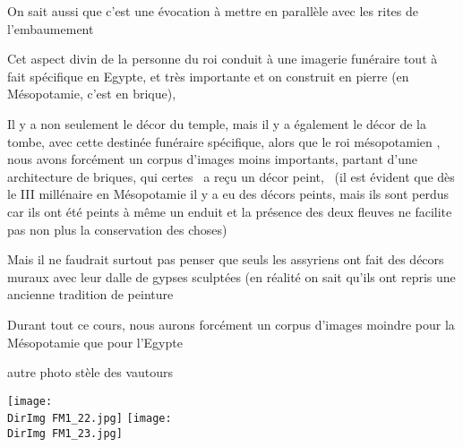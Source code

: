 \documentclass[a4paper]{article}
\newcommand{\DirImg}{../img/FaivreMartin/}
\begin{document}
On sait aussi que c'est une évocation à mettre en parallèle avec les rites de l'embaumement


Cet aspect divin de la personne du roi conduit à une imagerie funéraire tout à fait spécifique en Egypte, et très
importante et on construit en pierre (en Mésopotamie, c'est en brique), 

Il y a non seulement le décor du temple, mais il y a également le décor de la tombe, avec cette destinée funéraire
spécifique, alors que le roi mésopotamien , nous avons forcément un corpus d'images moins importants, partant d'une
architecture de briques, qui certes \ a reçu un décor peint, \ (il est évident que dès le III millénaire en Mésopotamie
il y a eu des décors peints, mais ils sont perdus car ils ont été peints à même un enduit et la présence des deux
fleuves ne facilite pas non plus la conservation des choses)


Mais il ne faudrait surtout pas penser que seuls les assyriens ont fait des décors muraux avec leur dalle de gypses
sculptées (en réalité on sait qu'ils ont repris une ancienne tradition de peinture


Durant tout ce cours, nous aurons forcément un corpus d'images moindre pour la Mésopotamie que pour l'Egypte


autre photo stèle des vautours


\texttt{[image: \\DirImg FM1\_22.jpg]} 
\texttt{[image: \\DirImg FM1\_23.jpg]} 
\end{document}
